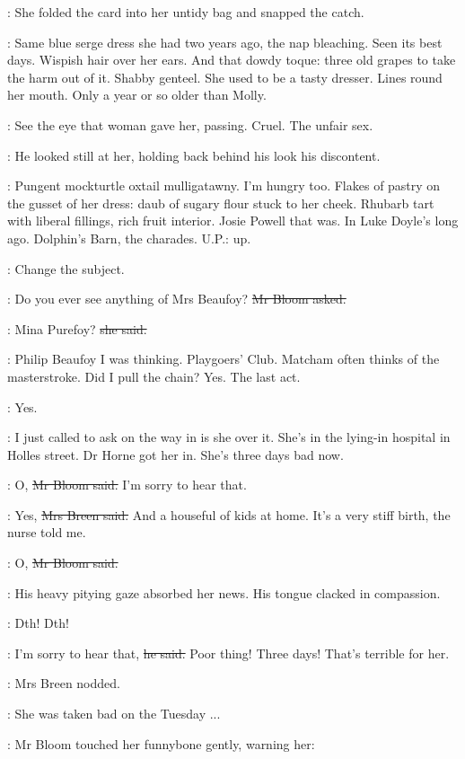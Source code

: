 :
She folded the card into her untidy bag and snapped the catch.

\BloomInt:
Same blue serge dress she had two years ago,
the nap bleaching.
Seen its best days.
Wispish hair over her ears.
And that dowdy toque:
three old grapes to take the harm out of it.
Shabby genteel.
She used to be a tasty dresser.
Lines round her mouth.
Only a year or so older than Molly.

\BloomInt:
See the eye that woman gave her,
passing.
Cruel.
The unfair sex.

:
He looked still at her,
holding back behind his look his discontent.

\BloomInt:
Pungent mockturtle oxtail mulligatawny.
I'm hungry too.
Flakes of pastry on the gusset of her dress:
daub of sugary flour stuck to her cheek.
Rhubarb tart with liberal fillings,
rich fruit interior.
Josie Powell that was.
In Luke Doyle's long ago.
Dolphin's Barn,
the charades.
U.P.:
up.

\BloomInt:
Change the subject.

\Bloom:
Do you ever see anything of Mrs Beaufoy?
\sout{Mr Bloom asked.}

\josie:
Mina Purefoy?
\sout{she said.}

\BloomInt:
Philip Beaufoy I was thinking.
Playgoers' Club.
Matcham often thinks of the masterstroke.
Did I pull the chain?
Yes.
The last act.

\Bloom:
Yes.

\josie:
I just called to ask on the way in is she over it.
She's in the lying-in hospital in Holles street.
Dr Horne got her in.
She's three days bad now.

\Bloom:
O,
\sout{Mr Bloom said.}
I'm sorry to hear that.

\josie:
Yes,
\sout{Mrs Breen said.}
And a houseful of kids at home.
It's a very stiff birth,
the nurse told me.

\Bloom:
O,
\sout{Mr Bloom said.}

:
His heavy pitying gaze absorbed her news.
His tongue clacked in compassion.

\Bloom:
Dth!
Dth!

\Bloom:
I'm sorry to hear that,
\sout{he said.}
Poor thing!
Three days!
That's terrible for her.%

:
Mrs Breen nodded.

\josie:
She was taken bad on the Tuesday ...

:
Mr Bloom touched her funnybone gently,
warning her:

